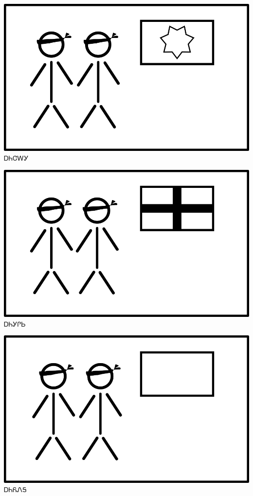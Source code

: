 \documentclass[avery5371]{flashcards}%
\begin{document}
    \begin{flashcard}{
        \includegraphics[width=0.95\columnwidth,height=.51\columnwidth,keepaspectratio]{../artwork/flags/anijalagi-flag-blind}
    }
        \Huge ᎠᏂᏣᎳᎩ
    \end{flashcard}

    \begin{flashcard}{
        \includegraphics[width=0.95\columnwidth,height=.51\columnwidth,keepaspectratio]{../artwork/flags/anigilisi-flag-blind}
    }
        \Huge ᎠᏂᎩᎵᏏ
    \end{flashcard}

    \begin{flashcard}{
        \includegraphics[width=0.95\columnwidth,height=.51\columnwidth,keepaspectratio]{../artwork/flags/aniyonega-flag-blind}
    }
        \Huge ᎠᏂᏲᏁᎦ
    \end{flashcard}
\end{document}
